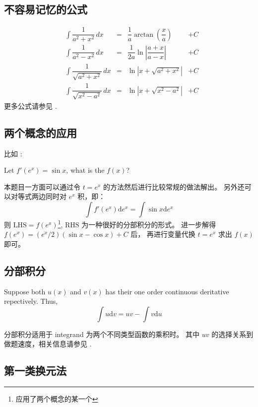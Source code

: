 \documentclass{beaulivre}
\begin{document}
\subsection{不容易记忆的公式}

\begin{align}
    &\int \dfrac{1}{{a^2 + x^2}} \, dx          &=& \dfrac{1}{a} \arctan \left( \dfrac{x}{a} \right)      &+ C\\
    &\int \dfrac{1}{{a^2 - x^2}} \, dx          &=& \dfrac{1}{2a} \ln \left| \dfrac{a + x}{a - x} \right| &+ C\\
    &\int \dfrac{1}{{\sqrt{a^2 + x^2}}} \, dx   &=& \ln \left| x + \sqrt{a^2 + x^2} \right|               &+ C\\
    &\int \dfrac{1}{{\sqrt{x^2 - a^2}}} \, dx   &=& \ln \left| x + \sqrt{x^2 - a^2} \right|               &+ C
\end{align}
更多公式请参见 \cite[page 93, pdf 104]{we}.

\subsection{两个概念的应用}

比如 \cite[page 101, example 1]{we}:
\begin{example}
    Let $f'(e^x) = \sin x$, what is the $f(x)$?
\end{example}
本题目一方面可以通过令 $t = e^x$ 的方法然后进行比较常规的做法解出。
另外还可以对等式两边同时对 $e^x$ 积，即：
\[
    \int f'(e^x) \mbox{d} e^x = \int \sin x \mbox{d} e^x
\]
则 $\mbox{LHS} = f(e^x)$\footnote{应用了两个概念的某一个}, 
$\mbox{RHS}$ 为一种很好的分部积分的形式。
进一步解得 $f(e^x) = (e^x/2) (\sin x - \cos x) + C$ 后，
再进行变量代换 $t = e^x$ 求出 $f(x)$ 即可。

\subsection{分部积分}

\begin{definition}
    Suppose both $u(x)$ and $v(x)$ has their one order continuous deritative repectively.
    Thus, 
    \[
        \int u \mbox{d} v = uv - \int v \mbox{d} u
    \]
\end{definition}

分部积分适用于 integrand 为两个不同类型函数的乘积时。
其中 $uv$ 的选择关系到做题速度，相关信息请参见 \cite[page 95, pdf 106]{we}.

\subsection{第一类换元法}
\end{document}
